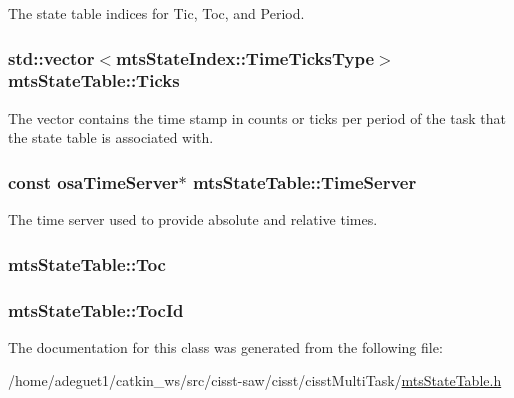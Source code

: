 The state table indices for Tic, Toc, and Period. \hypertarget{classmts_state_table_a387cab6dc638d33ded48538d13274068}{
\subsubsection[{Ticks}]{\setlength{\rightskip}{0pt plus 5cm}std\-::vector$<${\bf mts\-State\-Index\-::\-Time\-Ticks\-Type}$>$ mts\-State\-Table\-::\-Ticks\hspace{0.3cm}{\ttfamily [protected]}}}\label{classmts_state_table_a387cab6dc638d33ded48538d13274068}
The vector contains the time stamp in counts or ticks per period of the task that the state table is associated with. \hypertarget{classmts_state_table_a3d0a1bf75c293caad7ab30cd581b18e4}{
\subsubsection[{Time\-Server}]{\setlength{\rightskip}{0pt plus 5cm}const {\bf osa\-Time\-Server}$\ast$ mts\-State\-Table\-::\-Time\-Server\hspace{0.3cm}{\ttfamily [protected]}}}\label{classmts_state_table_a3d0a1bf75c293caad7ab30cd581b18e4}
The time server used to provide absolute and relative times. \hypertarget{classmts_state_table_a03193d2edccd43f42e65aaec7207708f}{
\subsubsection[{Toc}]{ mts\-State\-Table\-::\-Toc}}\label{classmts_state_table_a03193d2edccd43f42e65aaec7207708f}
\hypertarget{classmts_state_table_aa2e6cbe1e5ae5a1a58ebe3fcff10db35}{
\subsubsection[{Toc\-Id}]{ mts\-State\-Table\-::\-Toc\-Id\hspace{0.3cm}{\ttfamily [protected]}}}\label{classmts_state_table_aa2e6cbe1e5ae5a1a58ebe3fcff10db35}


The documentation for this class was generated from the following file\-:\begin{DoxyCompactItemize}
\item 
/home/adeguet1/catkin\-\_\-ws/src/cisst-\/saw/cisst/cisst\-Multi\-Task/\hyperlink{mts_state_table_8h}{mts\-State\-Table.\-h}\end{DoxyCompactItemize}
